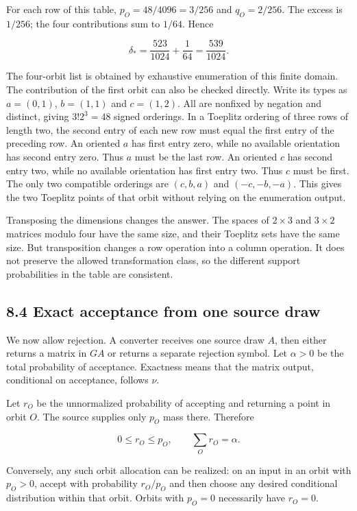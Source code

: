 \documentclass[
]{article}
\begin{document}
For each row of this table, \(p_O=48/4096=3/256\) and \(q_O=2/256\). The
excess is \(1/256\); the four contributions sum to \(1/64\). Hence

\[
\delta_* =\frac{523}{1024}+\frac1{64}
=\frac{539}{1024}.
\]

The four-orbit list is obtained by exhaustive enumeration of this finite
domain. The contribution of the first orbit can also be checked
directly. Write its types as \(a=(0,1)\), \(b=(1,1)\) and \(c=(1,2)\).
All are nonfixed by negation and distinct, giving \(3!2^3=48\) signed
orderings. In a Toeplitz ordering of three rows of length two, the
second entry of each new row must equal the first entry of the preceding
row. An oriented \(a\) has first entry zero, while no available
orientation has second entry zero. Thus \(a\) must be the last row. An
oriented \(c\) has second entry two, while no available orientation has
first entry two. Thus \(c\) must be first. The only two compatible
orderings are \((c,b,a)\) and \((-c,-b,-a)\). This gives the two
Toeplitz points of that orbit without relying on the enumeration output.

Transposing the dimensions changes the answer. The spaces of
\(2\times3\) and \(3\times2\) matrices modulo four have the same size,
and their Toeplitz sets have the same size. But transposition changes a
row operation into a column operation. It does not preserve the allowed
transformation class, so the different support probabilities in the
table are consistent.

\subsection{8.4 Exact acceptance from one source
draw}\label{exact-acceptance-from-one-source-draw}

We now allow rejection. A converter receives one source draw \(A\), then
either returns a matrix in \(GA\) or returns a separate rejection
symbol. Let \(\alpha>0\) be the total probability of acceptance.
Exactness means that the matrix output, conditional on acceptance,
follows \(\nu\).

Let \(r_O\) be the unnormalized probability of accepting and returning a
point in orbit \(O\). The source supplies only \(p_O\) mass there.
Therefore

\[
0\le r_O\le p_O,\qquad \sum_O r_O=\alpha.
\]

Conversely, any such orbit allocation can be realized: on an input in an
orbit with \(p_O>0\), accept with probability \(r_O/p_O\) and then
choose any desired conditional distribution within that orbit. Orbits
with \(p_O=0\) necessarily have \(r_O=0\).
\end{document}
